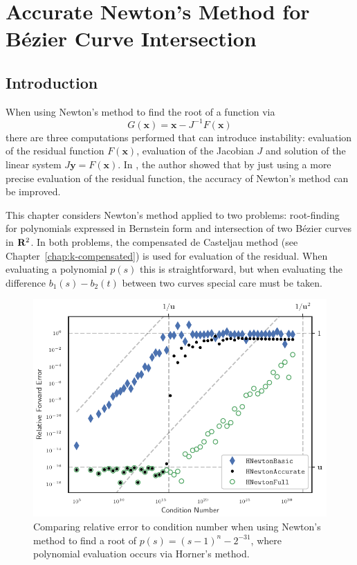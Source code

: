 \chapter{Accurate Newton's Method for B\'{e}zier Curve Intersection}
\label{chap:compensated-newton}

\section{Introduction}

When using Newton's method to find the root of a function via
\begin{equation}
G\left(\bm{x}\right) = \bm{x} - J^{-1} F\left(\bm{x}\right)
\end{equation}
there are three computations performed that can introduce instability:
evaluation of the residual function \(F\left(\bm{x}\right)\), evaluation
of the Jacobian \(J\) and solution of the linear system \(J \bm{y} =
F\left(\bm{x}\right)\). In \cite{Tisseur2001}, the author showed that by
just using a more precise evaluation of the residual function, the
accuracy of Newton's method can be improved.

This chapter considers Newton's method applied to two problems:
root-finding for polynomials expressed in Bernstein form and
intersection of two B\'{e}zier curves in \(\mathbf{R}^2\). In both problems,
the compensated de Casteljau method (see Chapter~\ref{chap:k-compensated}) is
used for evaluation of the residual. When evaluating a polynomial
\(p(s)\) this is straightforward, but when evaluating the difference
\(b_1(s) - b_2(t)\) between two curves special care must be taken.

\begin{figure}
  \includegraphics{../images/compensated-newton/newton_jghplus13.pdf}
  \centering
  \captionsetup{width=.75\linewidth}
  \caption{Comparing relative error to condition number when using Newton's
    method to find a root of \(p(s) = (s - 1)^n - 2^{-31}\), where polynomial
    evaluation occurs via Horner's method.}
  \label{fig:jgh+13}
\end{figure}

